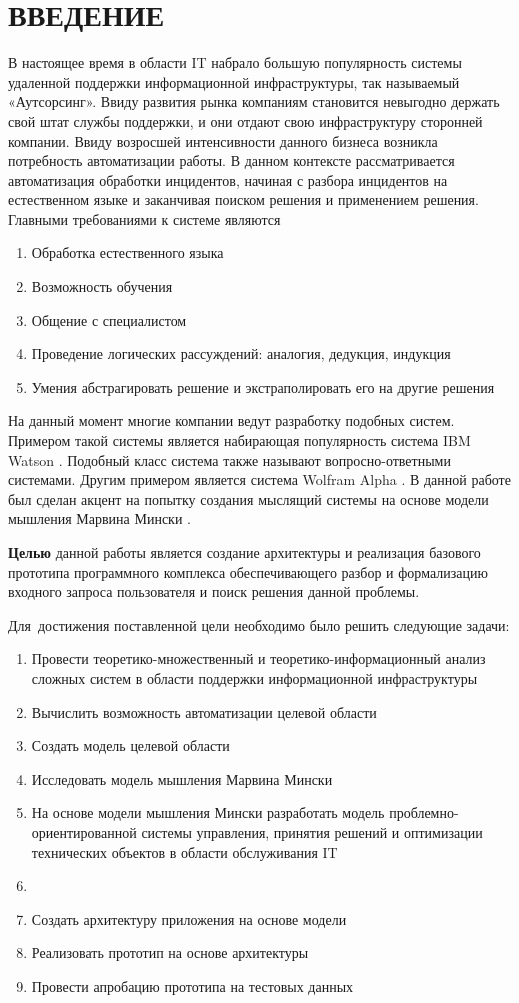 \chapter*{ВВЕДЕНИЕ}							%
В настоящее время в области IT набрало большую популярность системы удаленной поддержки информационной инфраструктуры, так называемый «Аутсорсинг». Ввиду развития рынка компаниям становится невыгодно держать свой штат службы поддержки, и они отдают свою инфраструктуру сторонней компании.
Ввиду возросшей интенсивности данного бизнеса возникла потребность автоматизации работы. В данном контексте рассматривается автоматизация обработки инцидентов, начиная с разбора инцидентов на естественном языке и заканчивая поиском решения и применением решения.
Главными требованиями к системе являются
\begin{enumerate}
  \item Обработка естественного языка
  \item Возможность обучения
  \item Общение с специалистом
  \item Проведение логических рассуждений: аналогия, дедукция, индукция
  \item Умения абстрагировать решение и экстраполировать его на другие решения
\end{enumerate}
На данный момент многие компании ведут разработку подобных систем. Примером такой системы является набирающая популярность система IBM Watson \cite{Watson}. Подобный класс система также называют вопросно-ответными системами. Другим примером является система Wolfram Alpha \cite{WolframAplha}.
В данной работе был сделан акцент на попытку создания мыслящий системы на основе модели мышления Марвина Мински \cite{EmotionMachine}.

\textbf{Целью} данной работы является создание архитектуры и реализация базового прототипа программного комплекса обеспечивающего разбор и формализацию входного запроса пользователя и поиск решения данной проблемы.

Для~достижения поставленной цели необходимо было решить следующие задачи:
\begin{enumerate}
  \item Провести теоретико-множественный и теоретико-информационный анализ сложных систем в области поддержки информационной инфраструктуры
  \item Вычислить возможность автоматизации целевой области
  \item Создать модель целевой области
  \item Исследовать модель мышления Марвина Мински
  \item На основе модели мышления Мински разработать модель проблемно-ориентированной системы управления, принятия решений и оптимизации технических объектов в области обслуживания IT  
  \item \item Создать архитектуру приложения на основе модели
  \item Реализовать прототип на основе архитектуры
  \item Провести апробацию прототипа на тестовых данных
\end{enumerate}

